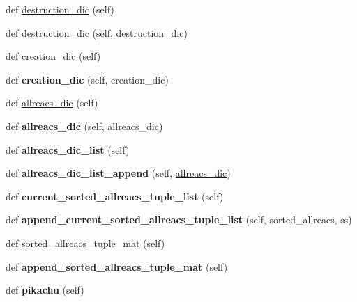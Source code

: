 \begin{DoxyCompactItemize}
\item 
def \hyperlink{classonix_1_1passport_1_1Passport_a72309e1d174814115256e4504e3893fe}{destruction\+\_\+dic} (self)
\item 
def \hyperlink{classonix_1_1passport_1_1Passport_a1bde7187f237c80ba5253fb839d5e485}{destruction\+\_\+dic} (self, destruction\+\_\+dic)
\item 
def \hyperlink{classonix_1_1passport_1_1Passport_a63204bdcdd9f74bcc112ea1e7344390a}{creation\+\_\+dic} (self)
\item 
\mbox{\label{classonix_1_1passport_1_1Passport_afb164a58e971685183bd73de8fd59333}} 
def {\bfseries creation\+\_\+dic} (self, creation\+\_\+dic)
\item 
def \hyperlink{classonix_1_1passport_1_1Passport_a28f60bf6ea7bc37eeb5ebc43628de197}{allreacs\+\_\+dic} (self)
\item 
\mbox{\label{classonix_1_1passport_1_1Passport_a61b815b74ed55c4ab81b9180fc18e737}} 
def {\bfseries allreacs\+\_\+dic} (self, allreacs\+\_\+dic)
\item 
\mbox{\label{classonix_1_1passport_1_1Passport_acbe29ee750e5a96314303022417909cd}} 
def {\bfseries allreacs\+\_\+dic\+\_\+list} (self)
\item 
\mbox{\label{classonix_1_1passport_1_1Passport_af12de4e24cfdf0b7714551f340a9f413}} 
def {\bfseries allreacs\+\_\+dic\+\_\+list\+\_\+append} (self, \hyperlink{classonix_1_1passport_1_1Passport_a28f60bf6ea7bc37eeb5ebc43628de197}{allreacs\+\_\+dic})
\item 
\mbox{\label{classonix_1_1passport_1_1Passport_af25faa3a65f12df4c1c7b21e152d1947}} 
def {\bfseries current\+\_\+sorted\+\_\+allreacs\+\_\+tuple\+\_\+list} (self)
\item 
\mbox{\label{classonix_1_1passport_1_1Passport_a5a69d1c233b39de55b85b6f04057092e}} 
def {\bfseries append\+\_\+current\+\_\+sorted\+\_\+allreacs\+\_\+tuple\+\_\+list} (self, sorted\+\_\+allreacs, ss)
\item 
def \hyperlink{classonix_1_1passport_1_1Passport_a1b1159523d20ded8e1cdeb52d634f1d1}{sorted\+\_\+allreacs\+\_\+tuple\+\_\+mat} (self)
\item 
\mbox{\label{classonix_1_1passport_1_1Passport_a2c01ae307947fab230fd6f89309e888e}} 
def {\bfseries append\+\_\+sorted\+\_\+allreacs\+\_\+tuple\+\_\+mat} (self)
\item 
\mbox{\label{classonix_1_1passport_1_1Passport_a81bd1972f44c8f67c68449d6e8e590fe}} 
def {\bfseries pikachu} (self)
\end{DoxyCompactItemize}
